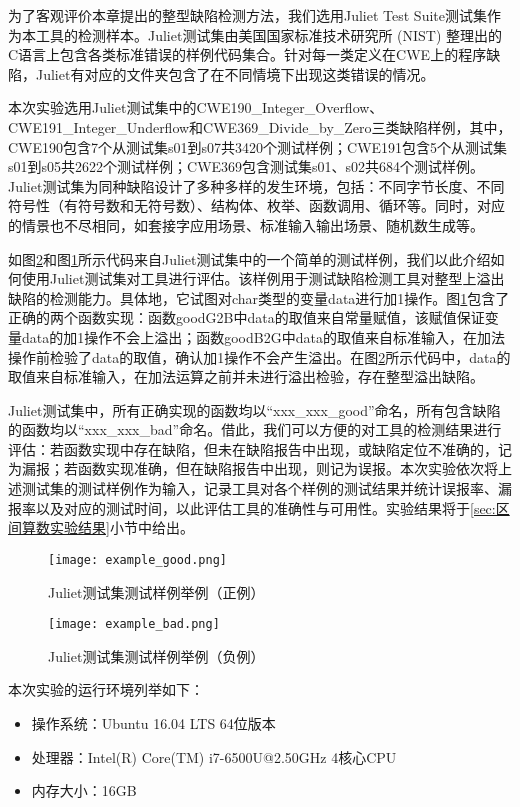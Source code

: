 为了客观评价本章提出的整型缺陷检测方法，我们选用Juliet Test Suite测试集作为本工具的检测样本。Juliet测试集由美国国家标准技术研究所 (NIST) 整理出的C语言上包含各类标准错误的样例代码集合。针对每一类定义在CWE上的程序缺陷，Juliet有对应的文件夹包含了在不同情境下出现这类错误的情况。

本次实验选用Juliet测试集中的CWE190\_Integer\_Overflow、CWE191\_Integer\_Underflow和CWE369\_Divide\_by\_Zero三类缺陷样例，其中，CWE190包含7个从测试集s01到s07共3420个测试样例；CWE191包含5个从测试集s01到s05共2622个测试样例；CWE369包含测试集s01、s02共684个测试样例。Juliet测试集为同种缺陷设计了多种多样的发生环境，包括：不同字节长度、不同符号性（有符号数和无符号数）、结构体、枚举、函数调用、循环等。同时，对应的情景也不尽相同，如套接字应用场景、标准输入输出场景、随机数生成等。

如图\ref{fig:example_bad}和图\ref{fig:example_good}所示代码来自Juliet测试集中的一个简单的测试样例，我们以此介绍如何使用Juliet测试集对工具进行评估。该样例用于测试缺陷检测工具对整型上溢出缺陷的检测能力。具体地，它试图对char类型的变量data进行加1操作。图\ref{fig:example_good}包含了正确的两个函数实现：函数goodG2B中data的取值来自常量赋值，该赋值保证变量data的加1操作不会上溢出；函数goodB2G中data的取值来自标准输入，在加法操作前检验了data的取值，确认加1操作不会产生溢出。在图\ref{fig:example_bad}所示代码中，data的取值来自标准输入，在加法运算之前并未进行溢出检验，存在整型溢出缺陷。

Juliet测试集中，所有正确实现的函数均以“xxx\_xxx\_good”命名，所有包含缺陷的函数均以“xxx\_xxx\_bad”命名。借此，我们可以方便的对工具的检测结果进行评估：若函数实现中存在缺陷，但未在缺陷报告中出现，或缺陷定位不准确的，记为漏报；若函数实现准确，但在缺陷报告中出现，则记为误报。本次实验依次将上述测试集的测试样例作为输入，记录工具对各个样例的测试结果并统计误报率、漏报率以及对应的测试时间，以此评估工具的准确性与可用性。实验结果将于\ref{sec:区间算数实验结果}小节中给出。

\begin{figure}[H]
	\centering
	\texttt{[image: example\_good.png]}
	\caption{Juliet测试集测试样例举例（正例）}
	\label{fig:example_good}
\end{figure}

\begin{figure}[H]
	\centering
	\texttt{[image: example\_bad.png]}
	\caption{Juliet测试集测试样例举例（负例）}
	\label{fig:example_bad}
\end{figure}



本次实验的运行环境列举如下：
\begin{itemize}
	\item 操作系统：Ubuntu 16.04 LTS 64位版本
	\item 处理器：Intel(R) Core(TM) i7-6500U@2.50GHz 4核心CPU
	\item 内存大小：16GB
\end{itemize}

